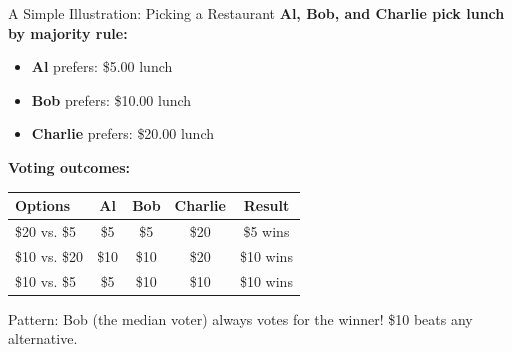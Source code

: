 \documentclass[10pt]{beamer}
\begin{document}
\begin{frame}[allowframebreaks]{A Simple Illustration: Picking a Restaurant}
\textbf{Al, Bob, and Charlie pick lunch by majority rule:}


\begin{itemize}
\item \textbf{Al} prefers: \alert{\$5.00} lunch
\item \textbf{Bob} prefers: \alert{\$10.00} lunch  
\item \textbf{Charlie} prefers: \alert{\$20.00} lunch
\end{itemize}



\textbf{Voting outcomes:}

\begin{table}
\centering
\small
\begin{tabular}{lcccc}
\toprule
\textbf{Options} & \textbf{Al} & \textbf{Bob} & \textbf{Charlie} & \textbf{Result} \\
\midrule
\$20 vs. \$5 & \$5 & \$5 & \$20 & \alert{\$5 wins} \\
\$10 vs. \$20 & \$10 & \$10 & \$20 & \alert{\$10 wins} \\
\$10 vs. \$5 & \$5 & \$10 & \$10 & \alert{\$10 wins} \\
\bottomrule
\end{tabular}
\end{table}



\alert{Pattern:} Bob (the median voter) always votes for the winner! \$10 beats any alternative.
\end{frame}
\end{document}
